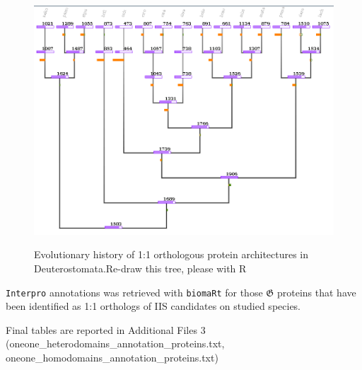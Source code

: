 \documentclass[11pt]{article}
\newcommand{\TODO}[1]{\begingroup\color{red}#1\endgroup}
\begin{document}
\begin{figure}[ht!]
\centering 
\includegraphics[scale=0.53]{figures/oneoneDollo} \\
\caption{Evolutionary history of 1:1 orthologous protein architectures in 
Deuterostomata.\TODO{Re-draw this tree, please with R}}\label{fig:dollooneone} 
\end{figure}

\texttt{Interpro} annotations was retrieved with \texttt{biomaRt} for 
those $\boldsymbol{\mathfrak{G}}$ proteins that have been identified
as 1:1 orthologs of IIS candidates on studied species.


\TODO{Final tables are reported in Additional Files 3 
(oneone\_heterodomains\_annotation\_proteins.txt, 
oneone\_homodomains\_annotation\_proteins.txt)}
\end{document}
